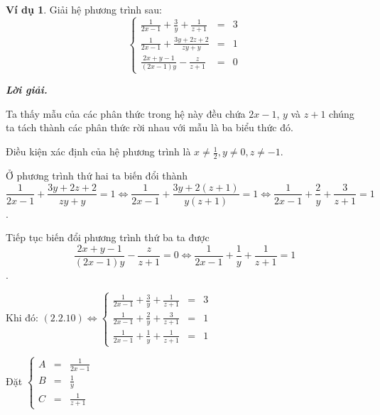 \documentclass[12pt,a4paper,oneside]{book}
\theoremstyle{theorem}
\theoremstyle{definition}
\newtheorem{vd}[theorem2]{Ví dụ}
\begin{document}
\begin{vd}
  Giải hệ phương trình sau:
    \begin{equation}
\left\{
\begin{array}{lcl}
\displaystyle \frac{1}{2x-1} + \frac{3}{y} +\frac{1}{z+1} &=& 3 \\[1.5ex]
\displaystyle \frac{1}{2x-1}+ \frac{3y+2z+2}{zy+y}&=&1 \\[1.5ex]
\displaystyle \frac{2x+y-1}{(2x-1)y} -\frac{z}{z+1}&=&0
\end{array}
\right.
\end{equation}

\textbf{\textit{Lời giải.}}

  Ta thấy mẫu của các phân thức trong hệ này đều chứa $2x-1$, $y$ và $z+1$  chúng ta tách thành các phân thức rời nhau với mẫu là ba biểu thức đó.

    Điều kiện xác định của hệ phương trình là $x\neq \displaystyle\frac{1}2,y\neq0,z\neq-1$.
    
    Ở phương trình thứ hai ta biến đổi thành 
    \[
    \displaystyle \frac{1}{2x-1}+ \frac{3y+2z+2}{zy+y}=1 \Leftrightarrow \frac{1}{2x-1}+\frac{3y+2(z+1)}{y(z+1)}=1\Leftrightarrow \frac{1}{2x-1} +\frac{2}{y}+\frac{3}{z+1}=1
    \].

    Tiếp tục biến đổi phương trình thứ ba ta được
     \[
    \displaystyle \frac{2x+y-1}{(2x-1)y} -\frac{z}{z+1}=0\Leftrightarrow \frac{1}{2x-1}+\frac{1}{y}+ \frac{1}{z+1}=1
    \].

    
Khi đó:
$(2.2.10)\Leftrightarrow\left\{
\begin{array}{lcl}
\displaystyle \frac{1}{2x-1} + \frac{3}{y} +\frac{1}{z+1} &=& 3 \\[1.5ex]
\displaystyle \frac{1}{2x-1} +\frac{2}{y}+\frac{3}{z+1}&=&1 \\[1.5ex]
\displaystyle \frac{1}{2x-1}+\frac{1}{y}+ \frac{1}{z+1}&=&1
\end{array}
\right.$ 

Đặt $\left\{
\begin{array}{lcl}
 A &=&\displaystyle \frac{1}{2x-1} \\[1.5ex]
 B&=& \displaystyle \frac{1}{y}\\[1.5ex]
 C&=&\displaystyle  \frac{1}{z+1}
\end{array}
\right.$


\end{vd}
\end{document}
